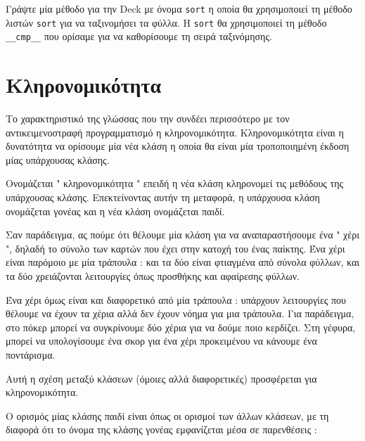 \documentclass[10pt]{book}
\begin{document}
\begin{exercise}

Γράψτε μία μέθοδο για την  Deck  με όνομα  {\tt sort}  η οποία θα 
χρησιμοποιεί τη μέθοδο λιστών  {\tt sort}  για να ταξινομήσει τα φύλλα.  
Η  {\tt sort}  θα χρησιμοποιεί τη μέθοδο  \verb"__cmp__"  που ορίσαμε για να 
καθορίσουμε τη σειρά ταξινόμησης.

\end{exercise}


\section{Κληρονομικότητα}

Το χαρακτηριστικό  της γλώσσας που την συνδέει περισσότερο με τον αντικειμενοστραφή 
προγραμματισμό η κληρονομικότητα.  Κληρονομικότητα είναι η δυνατότητα να ορίσουμε μία 
νέα κλάση η οποία θα είναι μία τροποποιημένη έκδοση μίας υπάρχουσας κλάσης.

Ονομάζεται  " κληρονομικότητα "  επειδή η νέα κλάση κληρονομεί τις μεθόδους 
της υπάρχουσας κλάσης.  Επεκτείνοντας αυτήν τη μεταφορά, η υπάρχουσα κλάση ονομάζεται 
γονέας και η νέα κλάση ονομάζεται παιδί.

Σαν παράδειγμα, ας πούμε ότι θέλουμε μία κλάση για να αναπαραστήσουμε ένα 
 " χέρι ",  δηλαδή το σύνολο των καρτών που έχει στην κατοχή του ένας 
παίκτης.  Ένα χέρι είναι παρόμοιο με μία τράπουλα :  και τα δύο είναι φτιαγμένα 
από σύνολα φύλλων, και τα δύο χρειάζονται λειτουργίες όπως προσθήκης και αφαίρεσης φύλλων.

Ένα χέρι όμως είναι και διαφορετικό από μία τράπουλα :  υπάρχουν λειτουργίες που 
θέλουμε να έχουν τα χέρια αλλά δεν έχουν νόημα για μια τράπουλα.  Για παράδειγμα, στο 
πόκερ μπορεί να συγκρίνουμε δύο χέρια για να δούμε ποιο κερδίζει.  Στη γέφυρα, μπορεί να 
υπολογίσουμε ένα σκορ για ένα χέρι προκειμένου να κάνουμε ένα ποντάρισμα.

Αυτή η σχέση μεταξύ κλάσεων (όμοιες αλλά διαφορετικές) προσφέρεται για κληρονομικότητα.

Ο ορισμός μίας κλάσης παιδί είναι όπως οι ορισμοί των άλλων κλάσεων, με τη διαφορά ότι 
το όνομα της κλάσης γονέας εμφανίζεται μέσα σε παρενθέσεις :
\end{document}
